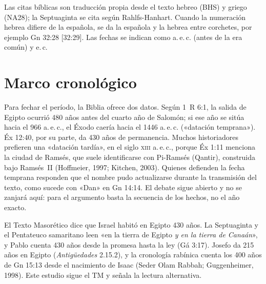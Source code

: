 \begin{nota}
Las citas bíblicas son traducción propia desde el texto hebreo (BHS) y griego (NA28); la Septuaginta se cita según Rahlfs-Hanhart. Cuando la numeración hebrea difiere de la española, se da la española y la hebrea entre corchetes, por ejemplo Gn 32:28 [32:29]. Las fechas se indican como a.\,e.\,c. (antes de la era común) y e.\,c.
\end{nota}

\section{Marco cronológico}

Para fechar el período, la Biblia ofrece dos datos. Según 1~R 6:1, la salida de Egipto ocurrió 480 años antes del cuarto año de Salomón; si ese año se sitúa hacia el 966 a.\,e.\,c., el Éxodo caería hacia el 1446 a.\,e.\,c. («datación temprana»). Éx 12:40, por su parte, da 430 años de permanencia. Muchos historiadores prefieren una «datación tardía», en el siglo \textsc{xiii} a.\,e.\,c., porque Éx 1:11 menciona la ciudad de Ramsés, que suele identificarse con Pi-Ramsés (Qantir), construida bajo Ramsés~II (Hoffmeier, 1997; Kitchen, 2003). Quienes defienden la fecha temprana responden que el nombre pudo actualizarse durante la transmisión del texto, como sucede con «Dan» en Gn 14:14. El debate sigue abierto y no se zanjará aquí: para el argumento basta la secuencia de los hechos, no el año exacto.

\begin{nota}
El Texto Masorético dice que Israel habitó en Egipto 430 años. La Septuaginta y el Pentateuco samaritano leen «en la tierra de Egipto \emph{y en la tierra de Canaán}», y Pablo cuenta 430 años desde la promesa hasta la ley (Gá 3:17). Josefo da 215 años en Egipto (\emph{Antigüedades} 2.15.2), y la cronología rabínica cuenta los 400 años de Gn 15:13 desde el nacimiento de Isaac (Seder Olam Rabbah; Guggenheimer, 1998). Este estudio sigue el TM y señala la lectura alternativa.
\end{nota}


